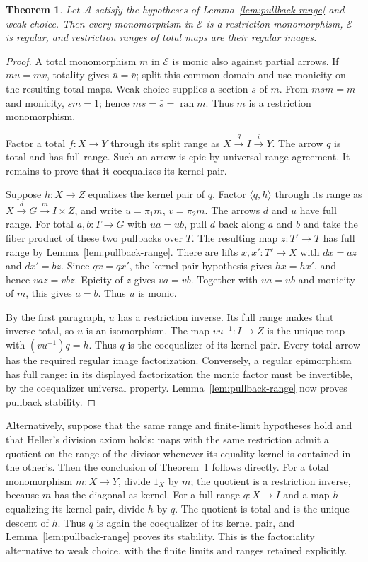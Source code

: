 \documentclass[11pt]{article}
\newtheorem{theorem}{Theorem}[section]
\theoremstyle{definition}\newtheorem{definition}[theorem]{Definition}
\theoremstyle{remark}\newtheorem{remark}[theorem]{Remark}
\newcommand{\A}{\mathscr A}
\newcommand{\E}{\mathscr E}
\newcommand{\ran}{\operatorname{ran}}
\begin{document}
\begin{theorem}\label{thm:regular}
Let $\A$ satisfy the hypotheses of Lemma~\ref{lem:pullback-range}
and weak choice. Then every monomorphism in $\E$ is a restriction
monomorphism, $\E$ is regular, and restriction ranges of total maps
are their regular images.
\end{theorem}
\begin{proof}
A total monomorphism $m$ in $\E$ is monic also against partial
arrows. If $mu=mv$, totality gives $\bar u=\bar v$; split this
common domain and use monicity on the resulting total maps.
Weak choice supplies a section $s$ of $m$. From $msm=m$ and
monicity, $sm=1$; hence $ms=\bar s=\ran m$. Thus $m$ is a
restriction monomorphism.

Factor a total $f:X\to Y$ through its split range as
$X\xrightarrow{q}I\xrightarrow{i}Y$. The arrow $q$ is total
and has full range. Such an arrow is epic by universal range
agreement. It remains to prove that it coequalizes its kernel pair.

Suppose $h:X\to Z$ equalizes the kernel pair of $q$. Factor
$\langle q,h\rangle$ through its range as
$X\xrightarrow{d}G\xrightarrow{m}I\times Z$, and write
$u=\pi_1m$, $v=\pi_2m$. The arrows $d$ and $u$ have full range.
For total $a,b:T\to G$ with $ua=ub$, pull $d$ back along $a$
and $b$ and take the fiber product of these two pullbacks over $T$.
The resulting map $z:T'\to T$ has full range by
Lemma~\ref{lem:pullback-range}. There are lifts $x,x':T'\to X$
with $dx=az$ and $dx'=bz$. Since $qx=qx'$, the kernel-pair
hypothesis gives $hx=hx'$, and hence $vaz=vbz$. Epicity of $z$
gives $va=vb$. Together with $ua=ub$ and monicity of $m$, this
gives $a=b$. Thus $u$ is monic.

By the first paragraph, $u$ has a restriction inverse. Its full
range makes that inverse total, so $u$ is an isomorphism. The map
$vu^{-1}:I\to Z$ is the unique map with $(vu^{-1})q=h$.
Thus $q$ is the coequalizer of its kernel pair. Every total arrow
has the required regular image factorization. Conversely, a regular
epimorphism has full range: in its displayed factorization the monic
factor must be invertible, by the coequalizer universal property.
Lemma~\ref{lem:pullback-range} now proves pullback stability.
\end{proof}

Alternatively, suppose that the same range and finite-limit
hypotheses hold and that Heller's division axiom holds: maps with
the same restriction admit a quotient on the range of the divisor
whenever its equality kernel is contained in the other's.
Then the conclusion of Theorem~\ref{thm:regular} follows directly.
For a total monomorphism $m:X\to Y$, divide $1_X$ by $m$;
the quotient is a restriction inverse, because $m$ has the
diagonal as kernel. For a full-range $q:X\to I$ and a map $h$
equalizing its kernel pair, divide $h$ by $q$. The quotient is
total and is the unique descent of $h$. Thus $q$ is again the
coequalizer of its kernel pair, and Lemma~\ref{lem:pullback-range}
proves its stability. This is the factoriality alternative to
weak choice, with the finite limits and ranges retained explicitly.
\end{document}
